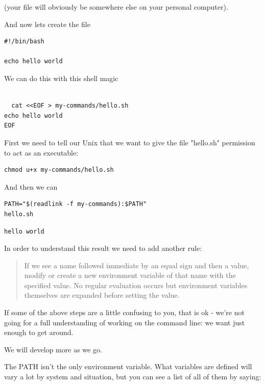 \documentclass[11pt]{article}
\begin{document}
(your file will obviously be somewhere else on your personal computer).

And now lets create the file

\begin{verbatim}
#!/bin/bash

echo hello world

\end{verbatim}

We can do this with this shell magic

\begin{verbatim}

  cat <<EOF > my-commands/hello.sh
echo hello world
EOF

\end{verbatim}

First we need to tell our Unix that we want to give the file
"hello.sh" permission to act as an executable:

\begin{verbatim}
chmod u+x my-commands/hello.sh
\end{verbatim}

And then we can 

\begin{verbatim}
PATH="$(readlink -f my-commands):$PATH"
hello.sh
\end{verbatim}

\begin{verbatim}
hello world
\end{verbatim}

In order to understand this result we need to add another rule:

\label{orgdb8dc30}
\begin{quote}
If we see a name followed immediate by an equal sign and then a value,
modify or create a new environment variable of that name with the
specified value. No regular evaluation occurs but environment
variables themselves are expanded before setting the value.
\end{quote}

If some of the above steps are a little confusing to you, that is ok -
we're not going for a full understanding of working on the command
line: we want just enough to get around.

We will develop more as we go.

The PATH isn't the only environment variable. What variables are
defined will vary a lot by system and situation, but you can see a
list of all of them by saying:
\end{document}
